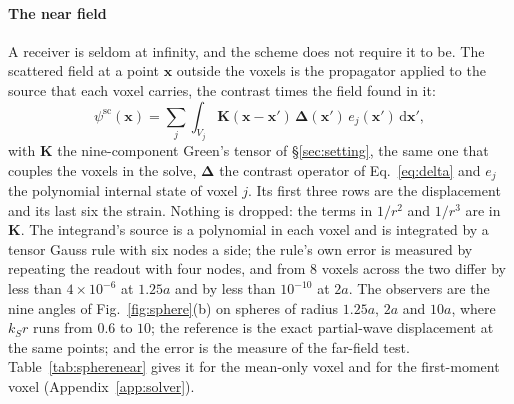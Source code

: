 \documentclass[preprint,review,12pt]{elsarticle}
\newcommand{\bK}{\mathbf{K}}
\newcommand{\bD}{\boldsymbol{\Delta}}
\newcommand{\dd}{\mathrm{d}}
\begin{document}
\paragraph{The near field} A receiver is seldom at infinity, and the scheme does not require it to
be. The scattered field at a point $\mathbf{x}$ outside the voxels is the propagator applied to the
source that each voxel carries, the contrast times the field found in it:
\begin{equation}\label{eq:nearfield}
  \psi^{\text{sc}}(\mathbf{x})=\sum_{j}\int_{V_j}
     \bK(\mathbf{x}-\mathbf{x}')\,\bD(\mathbf{x}')\,e_j(\mathbf{x}')\,\dd\mathbf{x}',
\end{equation}
with $\bK$ the nine-component Green's tensor of \S\ref{sec:setting}, the same one that couples the
voxels in the solve, $\bD$ the contrast operator of Eq.~\eqref{eq:delta} and $e_j$ the polynomial
internal state of voxel $j$. Its first three rows are the displacement and its last six the strain.
Nothing is dropped: the terms in $1/r^2$ and $1/r^3$ are in $\bK$. The integrand's source is a polynomial in each voxel and is integrated
by a tensor Gauss rule with six nodes a side; the rule's own error is measured by repeating the readout
with four nodes, and from $8$ voxels across the two differ by less than $4\times10^{-6}$ at $1.25a$ and
by less than $10^{-10}$ at $2a$. The observers are the nine angles of Fig.~\ref{fig:sphere}(b) on
spheres of radius $1.25a$, $2a$ and $10a$, where $k_Sr$ runs from $0.6$ to $10$; the reference is the
exact partial-wave displacement at the same points; and the error is the measure of the far-field
test. Table~\ref{tab:spherenear} gives it for the mean-only voxel and for the first-moment voxel
(Appendix~\ref{app:solver}).
\end{document}
